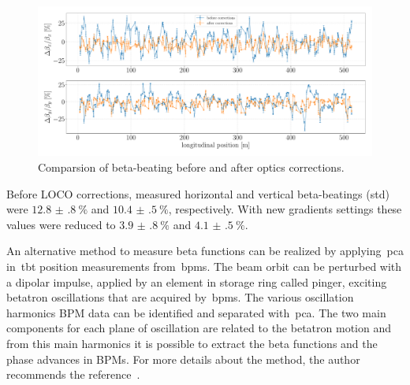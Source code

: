 \begin{figure}
\centering
\includegraphics[width=1.0\textwidth]{figures/beta_beating_progress_big.pdf}
\caption{Comparsion of beta-beating before and after optics corrections.}
\label{fig:beta_beating_progress}
\end{figure}

Before LOCO corrections, measured horizontal and vertical beta-beatings (std) were $\SI{12.8(8)}{\%}$ and $\SI{10.4(5)}{\%}$, respectively. With new gradients settings these values were reduced to $\SI{3.9(8)}{\%}$ and $\SI{4.1(5)}{\%}$.

An alternative method to measure beta functions can be realized by applying~\gls{pca} in~\gls{tbt} position measurements from~\glspl{bpm}. The beam orbit can be perturbed with a dipolar impulse, applied by an element in storage ring called pinger, exciting betatron oscillations that are acquired by~\glspl{bpm}. The various oscillation harmonics BPM data can be identified and separated with~\gls{pca}. The two main components for each plane of oscillation are related to the betatron motion and from this main harmonics it is possible to extract the beta functions and the phase advances in BPMs. For more details about the method, the author recommends the reference~\cite{huang2019beam}.


